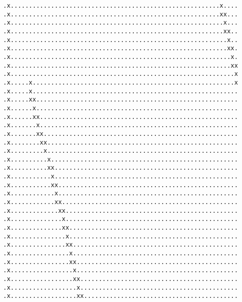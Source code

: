 {\begin{verbatim}
.x.........................................................x....
.x.........................................................xx...
.x..........................................................x...
.x..........................................................xx..
.x...........................................................x..
.x...........................................................xx.
.x............................................................x.
.x............................................................xx
.x.............................................................x
.x.....x.......................................................x
.x.....x........................................................
.x.....xx.......................................................
.x......x.......................................................
.x......xx......................................................
.x.......x......................................................
.x.......xx.....................................................
.x........xx....................................................
.x.........x....................................................
.x..........x...................................................
.x..........xx..................................................
.x...........x..................................................
.x...........xx.................................................
.x............x.................................................
.x............xx................................................
.x.............xx...............................................
.x..............x...............................................
.x..............xx..............................................
.x...............x..............................................
.x...............xx.............................................
.x................x.............................................
.x................xx............................................
.x.................x............................................
.x.................xx...........................................
.x..................x...........................................
.x..................xx..........................................\end{verbatim}
}
